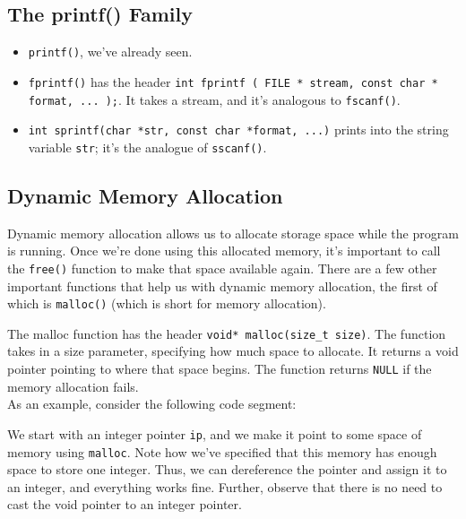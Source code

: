 \subsection{The printf() Family}

\begin{itemize}
    \item \verb!printf()!, we've already seen.
    \item \verb!fprintf()! has the header \verb!int fprintf ( FILE * stream, const char * format, ... );!. It takes a stream, and it's analogous to \verb!fscanf()!. 
    \item \verb!int sprintf(char *str, const char *format, ...)! prints into the string variable \verb!str!; it's the analogue of \verb!sscanf()!. 
\end{itemize}


\subsection{Dynamic Memory Allocation}

Dynamic memory allocation allows us to allocate storage space while the program is running. Once we're done using this allocated memory, it's important to call the \verb!free()! function to make that space available again. There are a few other important functions that help us with dynamic memory allocation, the first of which is \verb!malloc()! (which is short for memory allocation). 


The malloc function has the header \verb!void* malloc(size_t size)!. The function takes in a size parameter, specifying how much space to allocate. It returns a void pointer pointing to where that space begins. The function returns \verb!NULL! if the memory allocation fails. \\


As an example, consider the following code segment:


\begin{center}

\end{center}


We start with an integer pointer \verb!ip!, and we make it point to some space of memory using \verb!malloc!. Note how we've specified that this memory has enough space to store one integer. Thus, we can dereference the pointer and assign it to an integer, and everything works fine. Further, observe that there is no need to cast the void pointer to an integer pointer. \\

